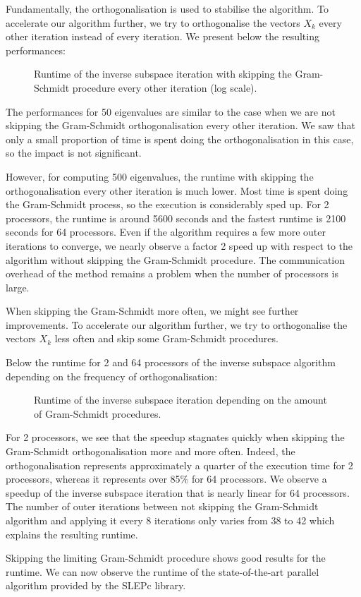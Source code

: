 Fundamentally, the orthogonalisation is used to stabilise the algorithm.
\ifthesis
 To accelerate our algorithm further, we try to orthogonalise the vectors \(X_k\) every other iteration instead of every iteration.
 We present below the resulting performances:

 \begin{figure}[H]
   \centering
   
   \caption{Runtime of the inverse subspace iteration with skipping the Gram-Schmidt procedure every other iteration (log scale).}
 \end{figure}

 The performances for 50 eigenvalues are similar to the case when we are not skipping the Gram-Schmidt orthogonalisation every other iteration.
 We saw that only a small proportion of time is spent doing the orthogonalisation in this case, so the impact is not significant.

 However, for computing 500 eigenvalues, the runtime with skipping the orthogonalisation every other iteration is much lower.
 Most time is spent doing the Gram-Schmidt process, so the execution is considerably sped up.
 For 2 processors, the runtime is around 5600 seconds and the fastest runtime is 2100 seconds for 64 processors.
 Even if the algorithm requires a few more outer iterations to converge, we nearly observe a factor 2 speed up with respect to the algorithm without skipping the Gram-Schmidt procedure.
 The communication overhead of the method remains a problem when the number of processors is large.

 When skipping the Gram-Schmidt more often, we might see further improvements.
\else
 To accelerate our algorithm further, we try to orthogonalise the vectors \(X_k\) less often and skip some Gram-Schmidt procedures.
\fi

Below the runtime for 2 and 64 processors of the inverse subspace algorithm depending on the frequency of orthogonalisation:

\begin{figure}[H]
  \centering
  
  \caption{Runtime of the inverse subspace iteration depending on the amount of Gram-Schmidt procedures.}
\end{figure}

For 2 processors, we see that the speedup stagnates quickly when skipping the Gram-Schmidt orthogonalisation more and more often.
Indeed, the orthogonalisation represents approximately a quarter of the execution time for 2 processors, whereas it represents over 85\% for 64 processors.
We observe a speedup of the inverse subspace iteration that is nearly linear for 64 processors.
The number of outer iterations between not skipping the Gram-Schmidt algorithm and applying it every 8 iterations only varies from 38 to 42 which explains the resulting runtime.

Skipping the limiting Gram-Schmidt procedure shows good results for the runtime.
We can now observe the runtime of the state-of-the-art parallel algorithm provided by the SLEPc library.
